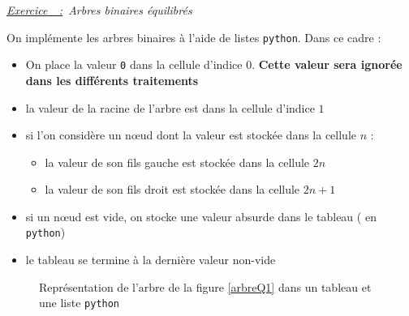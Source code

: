 \documentclass[a4paper, 11pt]{article}
\newcounter{exercice}
\newenvironment{Exercice}[1][]{
    \refstepcounter{exercice}
    \par
    \noindent
    {\large
    \underline{\textit{Exercice~\theexercice~:}}~#1}
    \par}
    {\vspace{1em}}
\newcommand{\python}{\texttt{python}}
\begin{document}
\begin{Exercice}[\textit{Arbres binaires équilibrés}]
  On implémente les arbres binaires à l'aide de listes \python. Dans ce cadre :
  \begin{itemize}
    \item On place la valeur \texttt{0} dans la cellule d'indice $0$. \textbf{Cette valeur sera ignorée dans les différents traitements}
    \item la valeur de la racine de l'arbre est dans la cellule d'indice $1$
    \item si l'on considère un nœud dont la valeur est stockée dans la cellule $n$ :
          \begin{itemize}
            \item la valeur de son fils gauche est stockée dans la cellule $2n$
            \item la valeur de son fils droit est stockée dans la cellule $2n+1$
          \end{itemize}
    \item si un nœud est vide, on stocke une valeur absurde dans le tableau ( en \python)
    \item le tableau se termine à la dernière valeur non-vide
  \end{itemize}

  \begin{figure}[!ht]
    \centering
    \footnotesize{
    }
    \caption{Représentation de l'arbre de la figure \ref{arbreQ1} dans un tableau et une liste \python}
  \end{figure}


\end{Exercice}
\end{document}
